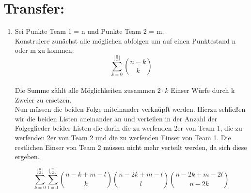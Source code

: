     \section*{Transfer:}
    \begin{enumerate}[label=(\alph*)]
        \item Sei Punkte Team 1 = n und Punkte Team 2 = m.\\
		Konstruiere zunächst alle möglichen abfolgen um auf einen Punktestand n oder m zu kommen:
		$$\sum\limits_{k=0}^{\lfloor \frac{n}{2} \rfloor}\binom{n-k}{k}$$\\
		Die Summe zählt alle Möglichkeiten zusammen $2 \cdot k$ Einser Würfe durch k Zweier zu ersetzen. 
		\\
		Nun müssen die beiden Folge miteinander verknüpft werden.
		Hierzu schließen wir die beiden Listen aneinander an und verteilen in der 
        Anzahl der Folgeglieder beider Listen die darin die zu werfenden 2er von Team 1, 
        die zu werfenden 2er von Team 2 und die zu werfenden Einser von Team 1. 
        Die restlichen Einser von Team 2 müssen nicht mehr verteilt werden, da sich diese ergeben.
		
		$$ \sum\limits_{k=0}^{\lfloor \frac{n}{2} \rfloor} \sum\limits_{l=0}^{\lfloor\frac{m}{2}\rfloor}\binom{n-k+m-l}{k}\binom{n-2k+m-l}{l}\binom{n-2k+m-2l}{n-2k}$$
    \end{enumerate}
